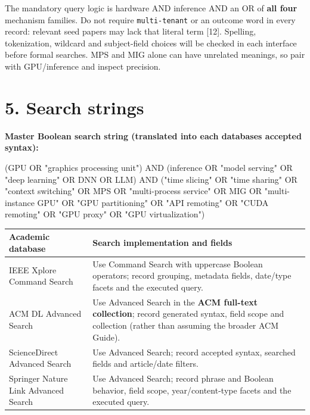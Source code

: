 \documentclass[
  12pt,
]{article}
\newenvironment{Shaded}{}{}
\newcommand{\NormalTok}[1]{#1}
\begin{document}
The mandatory query logic is hardware AND inference AND an OR of
\textbf{all four} mechanism families. Do not require
\texttt{multi-tenant} or an outcome word in every record: relevant seed
papers may lack that literal term {[}12{]}. Spelling, tokenization,
wildcard and subject-field choices will be checked in each interface
before formal searches. MPS and MIG alone can have unrelated meanings,
so pair with GPU/inference and inspect precision.

\hypertarget{5-search-strings}{%
\section{5. Search strings}\label{5-search-strings}}

\textbf{Master Boolean search string (translated into each
database\textquotesingle s accepted syntax):}

\begin{Shaded}
\begin{Highlighting}[]
\NormalTok{(GPU OR "graphics processing unit")}
\NormalTok{AND (inference OR "model serving" OR "deep learning" OR DNN OR LLM)}
\NormalTok{AND ("time slicing" OR "time sharing" OR "context switching"}
\NormalTok{     OR MPS OR "multi{-}process service" OR MIG OR "multi{-}instance GPU"}
\NormalTok{     OR "GPU partitioning" OR "API remoting" OR "CUDA remoting"}
\NormalTok{     OR "GPU proxy" OR "GPU virtualization")}
\end{Highlighting}
\end{Shaded}

\begin{longtable}[]{@{}p{}p{}@{}}
\toprule\noalign{}
Academic database & Search implementation and fields \\
\midrule\noalign{}
\endhead
\bottomrule\noalign{}
\endlastfoot
IEEE Xplore Command Search & Use Command Search with uppercase Boolean
operators; record grouping, metadata fields, date/type facets and the
executed query. \\
ACM DL Advanced Search & Use Advanced Search in the \textbf{ACM
full-text collection}; record generated syntax, field scope and
collection (rather than assuming the broader ACM Guide). \\
ScienceDirect Advanced Search & Use Advanced Search; record accepted
syntax, searched fields and article/date filters. \\
Springer Nature Link Advanced Search & Use Advanced Search; record
phrase and Boolean behavior, field scope, year/content-type facets and
the executed query. \\
\end{longtable}
\end{document}
